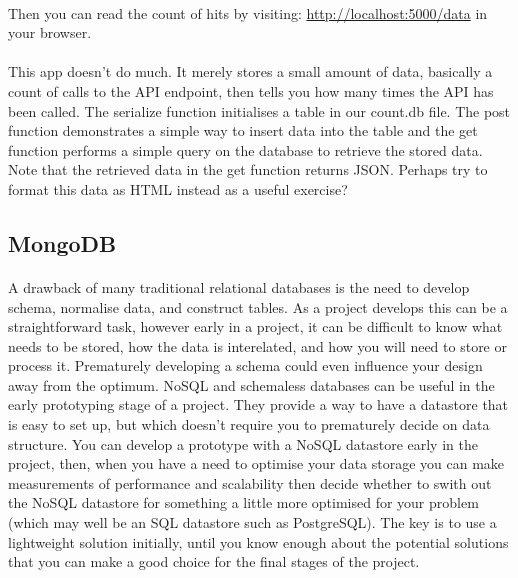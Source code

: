 \documentclass[10pt, a4paper, twosize]{article}
\begin{document}
\paragraph{} Then you can read the count of hits by visiting: \url{http://localhost:5000/data} in your browser.

\paragraph{} This app doesn't do much. It merely stores a small amount of data, basically a count of calls to the API endpoint, then tells you how many times the API has been called. The serialize function initialises a table in our count.db file.  The post function demonstrates a simple way to insert data into the table and the get function performs a simple query on the database to retrieve the stored data. Note that the retrieved data in the get function returns JSON. Perhaps try to format this data as HTML instead as a useful exercise?



\subsection{MongoDB}
\paragraph{} A drawback of many traditional relational databases is the need to develop schema, normalise data, and construct tables. As a project develops this can be a straightforward task, however early in a project, it can be difficult to know what needs to be stored, how the data is interelated, and how you will need to store or process it. Prematurely developing a schema could even influence your design away from the optimum. NoSQL and schemaless databases can be useful in the early prototyping stage of a project. They provide a way to have a datastore that is easy to set up, but which doesn't require you to prematurely decide on data structure. You can develop a prototype with a NoSQL datastore early in the project, then, when you have a need to optimise your data storage you can make measurements of performance and scalability then decide whether to swith out the NoSQL datastore for something a little more optimised for your problem (which may well be an SQL datastore such as PostgreSQL). The key is to use a lightweight solution initially, until you know enough about the potential solutions that you can make a good choice for the final stages of the project.
\end{document}
